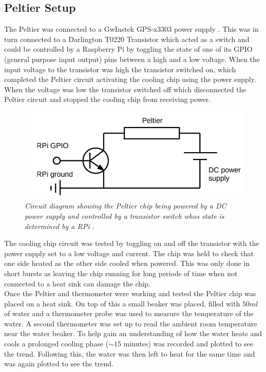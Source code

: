 \documentclass[10pt]{article}
\begin{document}
\subsection*{Peltier Setup}
The Peltier was connected to a GwInstek GPS-x3303 power supply \cite{powe_sup}. This was in turn connected to a Darlington T0220 Transistor \cite{trans} which acted as a switch and could be controlled by a Raspberry Pi by toggling the state of one of its GPIO (general purpose input output) pins between a high and a low voltage. When the input voltage to the transistor was high the transistor switched on, which completed the Peltier circuit activating the cooling chip using the power supply. When the voltage was low the transistor switched off which disconnected the Peltier circuit and stopped the cooling chip from receiving power.\\

\begin{figure}[h!]
    \centering
    \includegraphics[scale=0.5]{circuit.png}
    \caption{\it{Circuit diagram showing the Peltier chip being powered by a DC power supply and controlled by a transistor switch whos state is determined by a RPi \cite{course_notes}.}}
    \label{fig:circuit}
\end{figure}

The cooling chip circuit was tested by toggling on and off the transistor with the power supply set to a low voltage and current. The chip was held to check that one side heated as the other side cooled when powered. This was only done in short bursts as leaving the chip running for long periods of time when not connected to a heat sink can damage the chip. \\

Once the Peltier and thermometer were working and tested the Peltier chip was placed on a heat sink. On top of this a small beaker was placed, filled with $50ml$ of water and a thermometer probe was used to measure the temperature of the water. A second thermometer was set up to read the ambient room temperature near the water beaker. To help gain an understanding of how the water heats and cools a prolonged cooling phase ($\sim15$ minutes) was recorded and plotted to see the trend. Following this, the water was then left to heat for the same time and was again plotted to see the trend.
\end{document}

